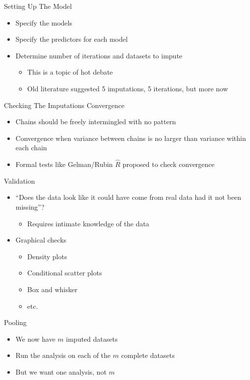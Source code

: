 \begin{frame}{Setting Up The Model}
\begin{itemize}
 \item Specify the models
 \item Specify the predictors for each model
 \item Determine number of iterations and datasets to impute
 \begin{itemize}
  \item This is a topic of hot debate
  \item Old literature suggested 5 imputations, 5 iterations, but more now
 \end{itemize}

\end{itemize}

\end{frame}

\begin{frame}{Checking The Imputations}
 Convergence
 \begin{itemize}
  \item Chains should be freely intermingled with no pattern
  \item Convergence when variance between chains is no larger than variance within each chain
  \item Formal tests like Gelman/Rubin $\hat{R}$ proposed to check convergence
 \end{itemize}
Validation
\begin{itemize}
 \item ``Does the data look like it could have come from real data had it not been missing''?
 \begin{itemize}
  \item Requires intimate knowledge of the data
 \end{itemize}
\item Graphical checks
\begin{itemize}
 \item Density plots
 \item Conditional scatter plots
 \item Box and whisker
 \item etc.
\end{itemize}

\end{itemize}
\end{frame}

\begin{frame}{Pooling}
 \begin{itemize}
  \item We now have $m$ imputed datasets
  \item Run the analysis on each of the $m$ complete datasets
  \item But we want one analysis, not $m$
 \end{itemize}

\end{frame}

